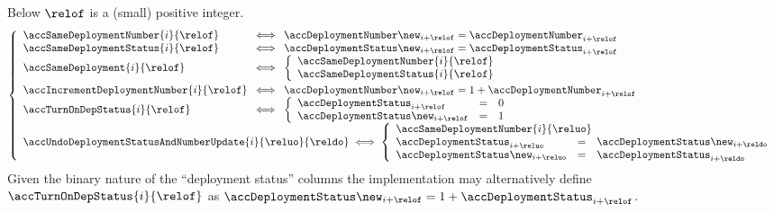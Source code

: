 Below $\relof$ is a (small) positive integer.
\[
	\left\{ \begin{array}{lcl}
		\accSameDeploymentNumber  {i}{\relof} & \!\!\! \iff \!\!\! & \accDeploymentNumber\new_{i + \relof} = \accDeploymentNumber_{i + \relof} \\
		\accSameDeploymentStatus  {i}{\relof} & \!\!\! \iff \!\!\! & \accDeploymentStatus\new_{i + \relof} = \accDeploymentStatus_{i + \relof} \\
		\accSameDeployment        {i}{\relof} & \!\!\! \iff \!\!\! &
		\left\{ \begin{array}{lcl}
			\multicolumn{3}{l}{\accSameDeploymentNumber {i}{\relof} } \\
			\multicolumn{3}{l}{\accSameDeploymentStatus {i}{\relof} } \\
		\end{array} \right. \vspace{1mm} \\
		\accIncrementDeploymentNumber  {i}{\relof} & \!\!\! \iff \!\!\! & \accDeploymentNumber\new_{i + \relof} = 1 + \accDeploymentNumber_{i + \relof} \\
		\accTurnOnDepStatus            {i}{\relof} & \!\!\! \iff \!\!\! &
		\left\{ \begin{array}{lcl}
			\accDeploymentStatus      _{i + \relof} & = & 0 \\
			\accDeploymentStatus\new  _{i + \relof} & = & 1 \\
		\end{array} \right. \\
		\multicolumn{3}{l}{
			\accUndoDeploymentStatusAndNumberUpdate {i}{\reluo}{\reldo} \iff
			\left\{ \begin{array}{lcl}
				\multicolumn{3}{l}{\accSameDeploymentNumber {i}{\reluo}} \\
				\accDeploymentStatus      _{i + \reluo} & = & \accDeploymentStatus\new  _{i + \reldo} \\
				\accDeploymentStatus\new  _{i + \reluo} & = & \accDeploymentStatus      _{i + \reldo} \\
			\end{array} \right. } \\
	\end{array} \right.
\]
\saNote{}
Given the binary nature of the ``deployment status'' columns
the implementation may alternatively define $\accTurnOnDepStatus {i}{\relof}$
as $\accDeploymentStatus\new _{i + \relof} = 1 + \accDeploymentStatus _{i + \relof}$.

